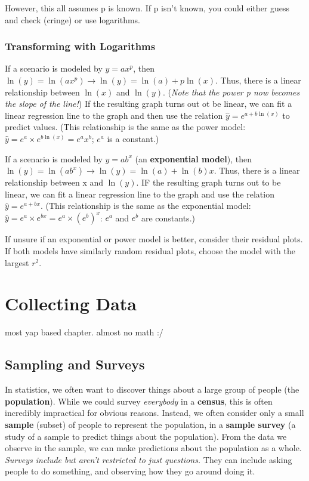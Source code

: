 \documentclass[12pt, a4paper]{article}
\theoremstyle{definition}
\begin{document}
However, this all assumes p is known. If p isn't known, you could either guess and check (cringe) or use logarithms.

\subsubsection{Transforming with Logarithms}

If a scenario is modeled by $y = ax^p$, then $\ln(y) = \ln(ax^p) \rightarrow \ln(y) = \ln(a) + p\ln(x)$.
Thus, there is a linear relationship between $\ln(x)$ and $\ln(y)$.
(\textit{Note that the power p now becomes the slope of the line!})
If the resulting graph turns out ot be linear, we can fit a linear regression line to the graph and then use the relation $\hat{y} = e^{a + b\ln(x)}$ to predict values.
(This relationship is the same as the power model: $\hat{y} = e^a \times e^{b\ln(x)} = e^a x^b$; $e^a$ is a constant.)

If a scenario is modeled by $y = ab^x$ (an \textbf{exponential model}), then $\ln(y) = \ln(ab^x) \rightarrow \ln(y) = \ln(a) + \ln(b)x$.
Thus, there is a linear relationship between x and $\ln(y)$.
IF the resulting graph turns out to be linear, we can fit a linear regression line to the graph and use the relation $\hat{y} = e^{a + bx}$.
(This relationship is the same as the exponential model: $\hat{y} = e^a \times e^{bx} = e^a \times (e^b)^x$: $e^a$ and $e^b$ are constants.)

If unsure if an exponential or power model is better, consider their residual plots.
If both models have similarly random residual plots, choose the model with the largest $r^2$.


\newpage

\section{Collecting Data}
most yap based chapter. almost no math :/

\subsection{Sampling and Surveys}

In statistics, we often want to discover things about a large group of people (the \textbf{population}).
While we could survey \textit{everybody} in a \textbf{census}, this is often incredibly impractical for obvious reasons.
Instead, we often consider only a small \textbf{sample} (subset) of people to represent the population, in a \textbf{sample survey} (a study of a sample to predict things about the population).
From the data we observe in the sample, we can make predictions about the population as a whole.
\textit{Surveys include but aren't restricted to just questions.} They can include asking people to do something, and observing how they go around doing it.
\end{document}

